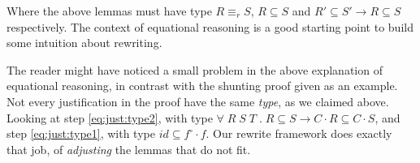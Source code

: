 Where the above lemmas must have type $R \equiv_r S$, $R \subseteq S$ and $R' \subseteq S' \rightarrow R \subseteq S$
respectively. The context of equational reasoning is a good starting point to build some intuition about rewriting.

The reader might have noticed a small problem in the above explanation of equational reasoning, 
in contrast with the shunting proof given as an example.
Not every justification in the proof have the same \emph{type}, as we claimed above. Looking at
step \ref{eq:just:type2}, with type $\forall\; R\; S\; T\;.\;R \subseteq S \rightarrow C \cdot R \subseteq C \cdot S$,
and step \ref{eq:just:type1}, with type $id \subseteq f^\circ \cdot f$. Our rewrite framework does exactly that job,
of \emph{adjusting} the lemmas that do not fit.




